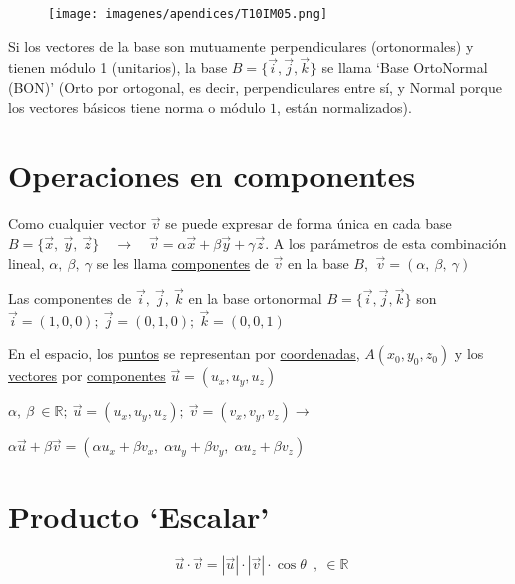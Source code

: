 \begin{multicols}{2}
	\begin{figure}[H]
	\centering
	\texttt{[image: imagenes/apendices/T10IM05.png]}
	\end{figure}
	Si los vectores de la base son mutuamente perpendiculares (ortonormales) y tienen módulo 1 (unitarios), la base $B=\{\vec i, \vec j, \vec k \}$ se llama `Base OrtoNormal (BON)' 
	\footnotesize{(Orto por ortogonal, es decir, perpendiculares entre sí, y Normal porque los vectores básicos tiene norma o módulo $1$, están normalizados)}\normalsize{.}
\end{multicols}

\section{Operaciones en componentes}

Como cualquier vector $\vec v$  se puede expresar de forma única en cada base $B=\{\vec x,\ \vec y, \ \vec z\} \quad \to \quad \vec v= \alpha \vec x+ \beta \vec y+ \gamma \vec z$. A los parámetros de esta combinación lineal, $\alpha, \ \beta, \ \gamma$ se les llama \underline{componentes} de $\vec v$ en la base $B$, $\ \vec v=(\alpha, \ \beta, \ \gamma)$
		
Las componentes de $\vec i, \ \vec j, \ \vec k$ en la base ortonormal $B=\{ \vec i, \vec j, \vec k \} $ son $\vec i=(1,0,0); \ \vec j=(0,1,0); \ \vec k=(0,0,1)$
		
 En el espacio, los \underline{puntos} se representan por \underline{coordenadas}, $A(x_0, y_0, z_0)$ y los \underline{vectores} por \underline{componentes} $\vec u=(u_x, u_y, u_z)$


		
\vspace{3mm} $ \alpha , \ \beta \ \in \mathbb{R}; \ \vec u=(u_x,u_y,u_z); \ \vec v = (v_x ,v_y ,v_z) \to $
		
\vspace{2mm}\hspace{20mm}$\alpha \vec u+\beta \vec v=
			(\alpha  u_x+\beta  v_x,\;  \alpha  u_y+\beta  v_y,\;  \alpha  u_z+\beta  v_z) $
			
\section{Producto `Escalar'}

\begin{equation}
	\boxed{\ \vec u \cdot \vec v = |\vec u| \cdot |\vec v| \cdot \cos \theta \ } \ ,\ \in \mathbb{R} 
\end{equation}			

